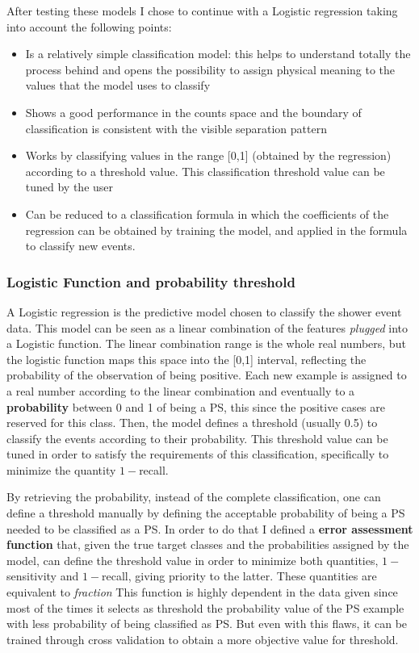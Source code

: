 \documentclass{article}
\begin{document}
After testing these models I chose to continue with a Logistic regression taking into account the following points:
\begin{itemize}
    \item Is a relatively simple classification model: this helps to understand totally the process behind and opens the possibility to assign physical meaning to the values that the model uses to classify
    \item Shows a good performance in the counts space and the boundary  of classification is consistent with the visible separation pattern
    \item Works by classifying values in the range [0,1] (obtained by the regression) according to a threshold value. This classification threshold value can be tuned by the user
    \item Can be reduced to a classification formula in which the coefficients of the regression can be obtained by training the model, and applied in the formula to classify new events.
    
\end{itemize}

\subsubsection{Logistic Function and probability threshold}
A Logistic regression is the predictive model chosen to classify the shower event data. This model can be seen as a linear combination of the features \textit{plugged} into a Logistic function. The linear combination range is the whole real numbers, but the logistic function maps this space into the [0,1] interval, reflecting the probability of the observation of being positive. Each new example is assigned to a real number according to the linear combination and eventually to a \textbf{probability}  between 0 and 1 of being a PS, this since the positive cases are reserved for this class. Then, the model defines a threshold (usually 0.5) to classify the events according to their probability. This threshold value can be tuned in order to satisfy the requirements of this classification, specifically to minimize the quantity $1-$recall.

By retrieving the probability, instead of the complete classification, one can define a threshold manually by defining the acceptable probability of being a PS needed to be classified as a PS. In order to do that I defined a \textbf{error assessment function} that, given the true target classes and the probabilities assigned by the model, can define the threshold value in order to minimize both quantities, $1-$sensitivity and $1-$recall, giving priority to the latter. These quantities are equivalent to \textit{fraction }This function is highly dependent in the data given since most of the times it selects as threshold the probability value of the PS example with less probability of being classified as PS. But even with this flaws, it can be trained through cross validation to obtain a more objective value for threshold.
\end{document}
